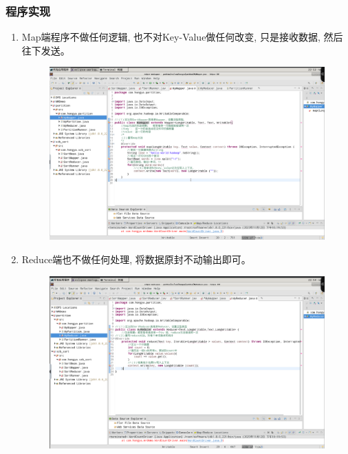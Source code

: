 \documentclass {article}
\begin{document}
			\subsubsection{程序实现}
				\begin{enumerate}
					\item Map端程序不做任何逻辑, 也不对Key-Value做任何改变, 只是接收数据, 然后往下发送。
					\begin{figure}[H]
						\centering
						\includegraphics[width=4.5in]{figures/fig10.png}
					\end{figure}
				
					\item Reduce端也不做任何处理, 将数据原封不动输出即可。
					\begin{figure}[H]
						\centering
						\includegraphics[width=4.5in]{figures/fig11.png}
					\end{figure}
				

\end{enumerate}
\end{document}
